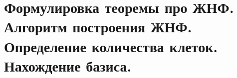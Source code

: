 \section{
    Формулировка теоремы про ЖНФ. Алгоритм построения ЖНФ. Определение количества клеток. Нахождение базиса. 
}

